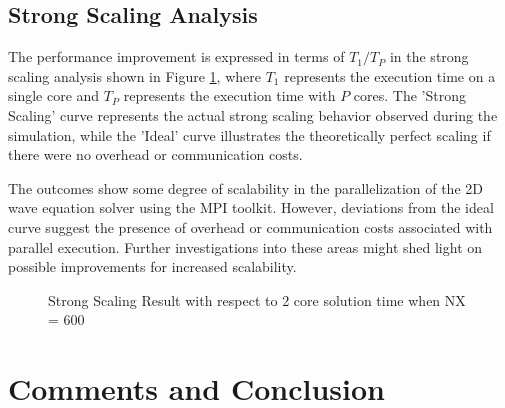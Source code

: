 \documentclass{article}
\begin{document}
\clearpage

\subsection{Strong Scaling Analysis}

The performance improvement is expressed in terms of \(T_1 / T_P\) in the strong scaling analysis shown in Figure \ref{t5}, where \(T_1\) represents the execution time on a single core and \(T_P\) represents the execution time with \(P\) cores. The 'Strong Scaling' curve represents the actual strong scaling behavior observed during the simulation, while the 'Ideal' curve illustrates the theoretically perfect scaling if there were no overhead or communication costs.

The outcomes show some degree of scalability in the parallelization of the 2D wave equation solver using the MPI toolkit. However, deviations from the ideal curve suggest the presence of overhead or communication costs associated with parallel execution. Further investigations into these areas might shed light on possible improvements for increased scalability.


\begin{figure}[hbt!]
  \centering
  \caption{Strong Scaling Result with respect to 2 core solution time when NX = 600}
  \label{t5}
\end{figure}

\clearpage

\section{Comments and Conclusion}
\end{document}
